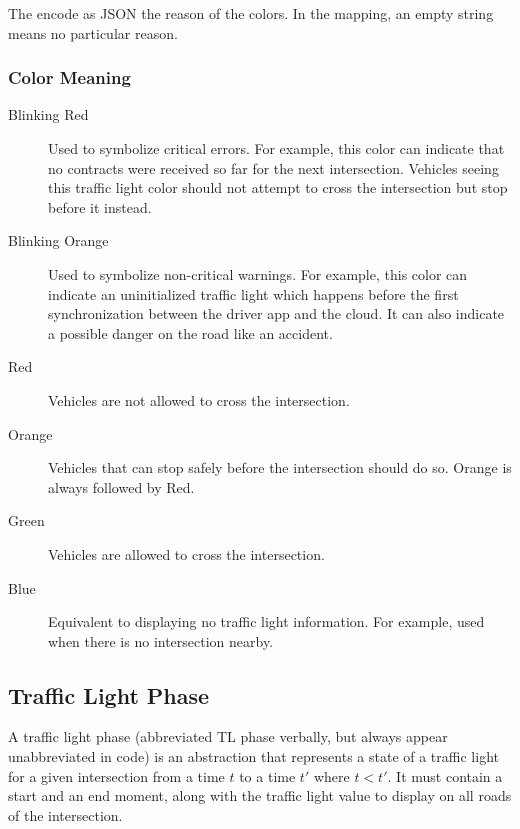 \documentclass[letterpaper,10pt,english]{sphinxmanual}
\begin{document}
The  encode as JSON the reason of the colors.
In the mapping, an empty string means no particular reason.


\subsubsection{Color Meaning}
\label{\detokenize{taxonomy_serialization:color-meaning}}\begin{description}
\item[{Blinking Red}] \leavevmode
Used to symbolize critical errors.
For example, this color can indicate that no contracts were received so far for the next intersection.
Vehicles seeing this traffic light color should not attempt to cross the intersection but stop before it instead.

\item[{Blinking Orange}] \leavevmode
Used to symbolize non-critical warnings.
For example, this color can indicate an uninitialized traffic light which happens before the first synchronization between the driver app and the cloud.
It can also indicate a possible danger on the road like an accident.

\item[{Red}] \leavevmode
Vehicles are not allowed to cross the intersection.

\item[{Orange}] \leavevmode
Vehicles that can stop safely before the intersection should do so.
Orange is always followed by Red.

\item[{Green}] \leavevmode
Vehicles are allowed to cross the intersection.

\item[{Blue}] \leavevmode
Equivalent to displaying no traffic light information.
For example, used when there is no intersection nearby.

\end{description}


\subsection{Traffic Light Phase}
\label{\detokenize{taxonomy_serialization:traffic-light-phase}}\label{\detokenize{taxonomy_serialization:id12}}
A traffic light phase (abbreviated TL phase verbally, but always appear unabbreviated in code) is an abstraction that represents a  state of a traffic light for a given intersection from a time \(t\) to a time \(t'\) where \(t < t'\).
It must contain a start and an end moment, along with the traffic light value to display on all roads of the intersection.
\end{document}
